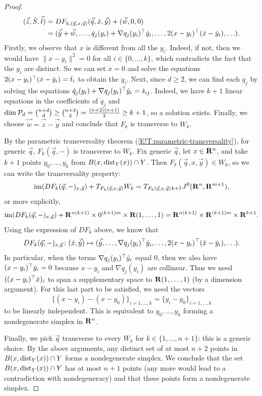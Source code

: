 \begin{proof}
  \begin{align*}
    (\vec{\dot{z}}, \dot{S}, \vec{\dot{t}}) & = DF_{k, (\vec{q}, x, \vec{y})} (\vec{\dot{q}}, \dot{x}, \vec{\dot{y}}) + (\vec{\dot{w}}, 0, 0) \\
    & = (\vec{\dot{y}} + \vec{\dot{w}}, \ldots, \dot{q}_j(y_i) + \nabla q_j(y_i)^\top \dot{y}_i, \ldots, 2(x - y_i)^\top (\dot{x} - \dot{y}_i), \ldots).
  \end{align*}
  Firstly, we observe that $x$ is different from all the $y_i$. Indeed, if not, then we would have $\| x - y_i \|^2 = 0$ for all $i \in \{0, \ldots, k\}$, which contradicts the fact that the $y_i$ are distinct. So we can set $\dot{x} = 0$ and solve the equations $2(x - y_i)^\top (\dot{x} - \dot{y}_i) = \dot{t}_i$ to obtain the $\dot{y}_i$.
  Next, since $d \geq 2$, we can find each $\dot{q}_j$ by solving the equations $\dot{q}_j(y_i) + \nabla q_j(y_i)^\top \dot{y}_i = \dot{s}_{ij}$. Indeed, we have $k + 1$ linear equations in the coefficients of $\dot{q}_j$ and $\dim \mathcal{P}_d = \binom{n + d}{d} \geq \binom{n + 2}{2} = \frac{(n + 2)(n + 1)}{2} \geq k + 1$, so a solution exists.
  Finally, we choose $\vec{\dot{w}} = \vec{\dot{z}} - \vec{\dot{y}}$ and conclude that $F_k$ is transverse to $W_k$.
  
  By the parametric transversality theorem (\cref{E!T:parametric-transversality}), for generic $\vec{q}$, $F_k(\vec{q}, -)$ is transverse to $W_k$. Fix generic $\vec{q}$, let $x \in \mathbf{R}^n$, and take $k + 1$ points $y_0, \ldots, y_k$ from $B(x, \operatorname{dist}_Y(x)) \cap Y$. Then $F_k(\vec{q}, x, \vec{y}) \in W_k$, so we can write the transversality property:
  \[
    \operatorname{im}(DF_k(\vec{q}, -)_{x, \vec{y}}) + T_{F_k(\vec{q}, x, \vec{y})} W_k = T_{F_k(\vec{q}, x, \vec{y})} {}_{k + 1} J^0(\mathbf{R}^n, \mathbf{R}^{m + 1}),
  \]
  or more explicitly,
  \[
    \operatorname{im}(DF_k(\vec{q}, -)_{x, \vec{y}}) + \mathbf{R}^{n (k + 1)} \times 0^{(k + 1) m} \times \mathbf{R} (1, \ldots, 1) = \mathbf{R}^{n (k + 1)} \times \mathbf{R}^{(k + 1) m} \times \mathbf{R}^{k + 1}.
  \]
  Using the expression of $DF_k$ above, we know that
  \[
    DF_k(\vec{q}, -)_{x, \vec{y}} \colon (\dot{x}, \vec{\dot{y}}) \mapsto (\vec{\dot{y}}, \ldots, \nabla q_j(y_i)^\top \dot{y}_i, \ldots, 2(x - y_i)^\top (\dot{x} - \dot{y}_i), \ldots).
  \]
  In particular, when the terms $\nabla q_j(y_i)^\top \dot{y}_i$ equal $0$, then we also have $(x - y_i)^\top \dot{y}_i = 0$ because $x - y_i$ and $\nabla q_j(y_i)$ are collinear. Thus we need $((x - y_i)^\top \dot{x})_i$ to span a supplementary space to $\mathbf{R} (1, \ldots, 1)$ (by a dimension argument). For this last part to be satisfied, we need the vectors
  \[
    \{(x - y_i) - (x - y_0)\}_{i = 1, \ldots, k} = \{y_i - y_0\}_{i = 1, \ldots ,k}
  \]
  to be linearly independent. This is equivalent to $y_0, \ldots, y_k$ forming a nondegenerate simplex in $\mathbf{R}^n$.
  
  Finally, we pick $\vec{q}$ transverse to every $W_k$ for $k \in \{1, \ldots, n + 1\}$: this is a generic choice. By the above arguments, any distinct set of at most $n + 2$ points in $B(x, \operatorname{dist}_Y(x)) \cap Y$ forms a nondegenerate simplex. We conclude that the set $B(x, \operatorname{dist}_Y(x)) \cap Y$ has at most $n + 1$ points (any more would lead to a contradiction with nondegeneracy) and that these points form a nondegenerate simplex.
\end{proof}

